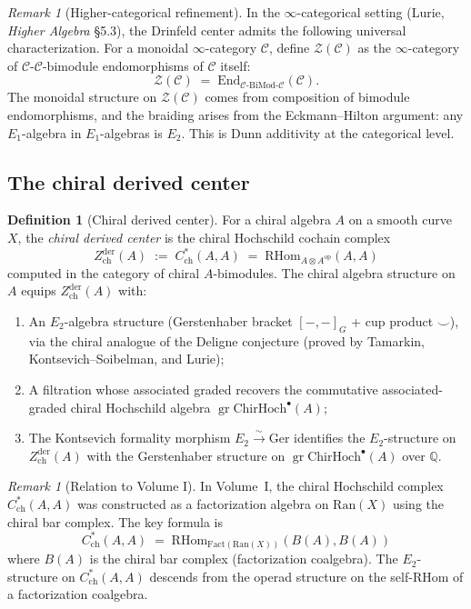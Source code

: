 \documentclass[11pt]{article}
\theoremstyle{definition}
\newtheorem{definition}[theorem]{Definition}
\theoremstyle{remark}
\newtheorem{remark}[theorem]{Remark}
\newcommand{\Ran}{\mathrm{Ran}}
\newcommand{\Fact}{\mathrm{Fact}}
\newcommand{\ChirHoch}{\mathrm{ChirHoch}}
\newcommand{\Ger}{\mathrm{Ger}}
\newcommand{\End}{\mathrm{End}}
\newcommand{\RHom}{\mathrm{RHom}}
\newcommand{\op}{\mathrm{op}}
\newcommand{\cC}{\mathcal{C}}
\newcommand{\cZ}{\mathcal{Z}}
\newcommand{\Zder}{Z^{\mathrm{der}}_{\mathrm{ch}}}
\newcommand{\BiMod}{\mathrm{BiMod}}
\begin{document}
\begin{remark}[Higher-categorical refinement]
\label{rem:higher-center}
In the $\infty$-categorical setting (Lurie, \emph{Higher Algebra} \S5.3), the Drinfeld center admits the following universal characterization. For a monoidal $\infty$-category $\cC$, define $\cZ(\cC)$ as the $\infty$-category of $\cC$-$\cC$-bimodule endomorphisms of $\cC$ itself:
\[
 \cZ(\cC) \;=\; \End_{\cC\text{-}\BiMod\text{-}\cC}(\cC).
\]
The monoidal structure on $\cZ(\cC)$ comes from composition of bimodule endomorphisms, and the braiding arises from the Eckmann--Hilton argument: any $E_1$-algebra in $E_1$-algebras is $E_2$. This is Dunn additivity at the categorical level.
\end{remark}


\subsection{The chiral derived center}

\begin{definition}[Chiral derived center]
\label{def:chiral-derived-center}
For a chiral algebra $A$ on a smooth curve $X$, the \emph{chiral derived center} is the chiral Hochschild cochain complex
\[
 \Zder(A) \;:=\; C^*_{\mathrm{ch}}(A, A) \;=\; \RHom_{A \otimes A^{\op}}(A, A)
\]
computed in the category of chiral $A$-bimodules. The chiral algebra structure on $A$ equips $\Zder(A)$ with:
\begin{enumerate}[label=(\roman*)]
 \item An $E_2$-algebra structure (Gerstenhaber bracket $[-,-]_G$ + cup product $\smile$), via the chiral analogue of the Deligne conjecture (proved by Tamarkin, Kontsevich--Soibelman, and Lurie);
 \item A filtration whose associated graded recovers the commutative associated-graded chiral Hochschild algebra $\operatorname{gr}\ChirHoch^\bullet(A)$;
 \item The Kontsevich formality morphism $E_2 \xrightarrow{\sim} \Ger$ identifies the $E_2$-structure on $\Zder(A)$ with the Gerstenhaber structure on $\operatorname{gr}\ChirHoch^\bullet(A)$ over $\mathbb{Q}$.
\end{enumerate}
\end{definition}

\begin{remark}[Relation to Volume I]
\label{rem:vol-i-relation}
In Volume~I, the chiral Hochschild complex $C^*_{\mathrm{ch}}(A,A)$ was constructed as a factorization algebra on $\Ran(X)$ using the chiral bar complex. The key formula is
\[
 C^*_{\mathrm{ch}}(A,A) \;=\; \RHom_{\Fact(\Ran(X))}(B(A), B(A))
\]
where $B(A)$ is the chiral bar complex (factorization coalgebra). The $E_2$-structure on $C^*_{\mathrm{ch}}(A,A)$ descends from the operad structure on the self-$\RHom$ of a factorization coalgebra.
\end{remark}
\end{document}

